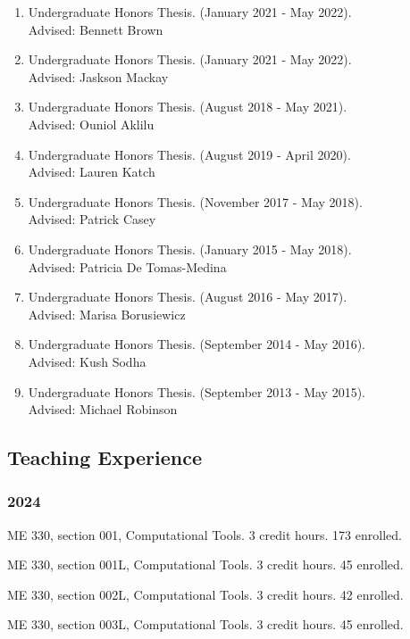 \documentclass[
]{article}
\begin{document}
\begin{enumerate}
\def\labelenumi{\arabic{enumi}.}
\item
  Undergraduate Honors Thesis. (January 2021 - May 2022).\\
  Advised: Bennett Brown
\item
  Undergraduate Honors Thesis. (January 2021 - May 2022).\\
  Advised: Jaskson Mackay
\item
  Undergraduate Honors Thesis. (August 2018 - May 2021).\\
  Advised: Ouniol Aklilu
\item
  Undergraduate Honors Thesis. (August 2019 - April 2020).\\
  Advised: Lauren Katch
\item
  Undergraduate Honors Thesis. (November 2017 - May 2018).\\
  Advised: Patrick Casey
\item
  Undergraduate Honors Thesis. (January 2015 - May 2018).\\
  Advised: Patricia De Tomas-Medina
\item
  Undergraduate Honors Thesis. (August 2016 - May 2017).\\
  Advised: Marisa Borusiewicz
\item
  Undergraduate Honors Thesis. (September 2014 - May 2016).\\
  Advised: Kush Sodha
\item
  Undergraduate Honors Thesis. (September 2013 - May 2015).\\
  Advised: Michael Robinson
\end{enumerate}

\subsection{Teaching Experience}\label{teaching-experience}

\subsubsection{2024}\label{section}

ME 330, section 001, Computational Tools. 3 credit hours. 173 enrolled.

ME 330, section 001L, Computational Tools. 3 credit hours. 45 enrolled.

ME 330, section 002L, Computational Tools. 3 credit hours. 42 enrolled.

ME 330, section 003L, Computational Tools. 3 credit hours. 45 enrolled.
\end{document}
